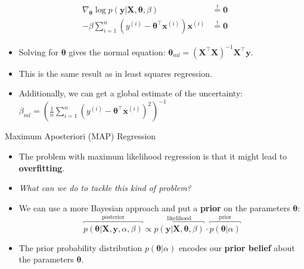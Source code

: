 \begin{frame}
	\begin{align}
		\nabla_{\bm{\theta}} \log p(\bm{y} \vert \bm{X}, \bm{\theta}, \beta)
			&\overset{!}{=} \bm{0} \\
		-\beta \sum_{i=1}^n (y^{(i)} - \bm{\theta}^{\intercal} \bm{x}^{(i)}) \bm{x}^{(i)}
			&\overset{!}{=} \bm{0}
	\end{align}
	
	\begin{itemize}
		\item Solving for $\bm{\theta}$ gives the normal equation: $\bm{\theta}_{ml} = (\bm{X}^{\intercal} \bm{X})^{-1} \bm{X}^{\intercal} \bm{y}$.
		\item This is the same result as in least squares regression.
		\item Additionally, we can get a global estimate of the uncertainty: $\beta_{ml} = \left( \frac{1}{n} \sum_{i=1}^n (y^{(i)} - \bm{\theta}^{\intercal} \bm{x}^{(i)})^2 \right)^{-1}$
	\end{itemize}

\end{frame}


\begin{dwHeaderFrame}{Maximum Aposteriori (MAP) Regression}
	\begin{itemize}
		\item The problem with maximum likelihood regression is that it might lead to \textbf{overfitting}.
		\item \textit{What can we do to tackle this kind of problem?}
		\item We can use a more Bayesian approach and put a \textbf{prior} on the parameters $\bm{\theta}$:
		\begin{equation}
			\overbracket{p(\bm{\theta} \vert \bm{X}, \bm{y}, \alpha, \beta)}^{\text{posterior}} \propto
				\overbracket{p(\bm{y} \vert \bm{X}, \bm{\theta}, \beta)}^{\text{likelihood}} \cdot
				\overbracket{p(\bm{\theta} \vert \alpha)}^{\text{prior}}
		\end{equation}
		\item The prior probability distribution $p(\bm{\theta} \vert \alpha)$ encodes our \textbf{prior belief} about the parameters $\bm{\theta}$.
	\end{itemize}
	
\end{dwHeaderFrame}


